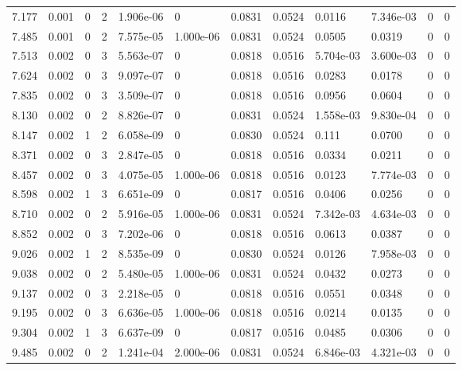 \documentclass[preview]{standalone}
\begin{document}
{{{\begin{tabular}{L{1.2cm}C{1.2cm} C{0.3cm}C{0.5cm} C{1.4cm}C{1.4cm} C{1.4cm}C{1.4cm} C{1.6cm}C{1.6cm} C{1.6cm}C{1.6cm}}
  7.177  &  0.001  & 0     &  2 &  1.906e-06  & 0  &  0.0831&   0.0524& 0.0116 & 7.346e-03   &  0 & 0  \\ 
  7.485  &  0.001  & 0     &  2 &  7.575e-05  & 1.000e-06  &  0.0831&   0.0524& 0.0505 & 0.0319   &  0 & 0  \\ 
  7.513  &  0.002  & 0     &  3 &  5.563e-07  & 0  &  0.0818&   0.0516& 5.704e-03 & 3.600e-03   &  0 & 0  \\ 
  7.624  &  0.002  & 0     &  3 &  9.097e-07  & 0  &  0.0818&   0.0516& 0.0283 & 0.0178   &  0 & 0  \\ 
  7.835  &  0.002  & 0     &  3 &  3.509e-07  & 0  &  0.0818&   0.0516& 0.0956 & 0.0604   &  0 & 0  \\ 
  8.130  &  0.002  & 0     &  2 &  8.826e-07  & 0  &  0.0831&   0.0524& 1.558e-03 & 9.830e-04   &  0 & 0  \\ 
  8.147  &  0.002  & 1     &  2 &  6.058e-09  & 0  &  0.0830&   0.0524& 0.111 & 0.0700   &  0 & 0  \\ 
  8.371  &  0.002  & 0     &  3 &  2.847e-05  & 0  &  0.0818&   0.0516& 0.0334 & 0.0211   &  0 & 0  \\ 
  8.457  &  0.002  & 0     &  3 &  4.075e-05  & 1.000e-06  &  0.0818&   0.0516& 0.0123 & 7.774e-03   &  0 & 0  \\ 
  8.598  &  0.002  & 1     &  3 &  6.651e-09  & 0  &  0.0817&   0.0516& 0.0406 & 0.0256   &  0 & 0  \\ 
  8.710  &  0.002  & 0     &  2 &  5.916e-05  & 1.000e-06  &  0.0831&   0.0524& 7.342e-03 & 4.634e-03   &  0 & 0  \\ 
  8.852  &  0.002  & 0     &  3 &  7.202e-06  & 0  &  0.0818&   0.0516& 0.0613 & 0.0387   &  0 & 0  \\ 
  9.026  &  0.002  & 1     &  2 &  8.535e-09  & 0  &  0.0830&   0.0524& 0.0126 & 7.958e-03   &  0 & 0  \\ 
  9.038  &  0.002  & 0     &  2 &  5.480e-05  & 1.000e-06  &  0.0831&   0.0524& 0.0432 & 0.0273   &  0 & 0  \\ 
  9.137  &  0.002  & 0     &  3 &  2.218e-05  & 0  &  0.0818&   0.0516& 0.0551 & 0.0348   &  0 & 0  \\ 
  9.195  &  0.002  & 0     &  3 &  6.636e-05  & 1.000e-06  &  0.0818&   0.0516& 0.0214 & 0.0135   &  0 & 0  \\ 
  9.304  &  0.002  & 1     &  3 &  6.637e-09  & 0  &  0.0817&   0.0516& 0.0485 & 0.0306   &  0 & 0  \\ 
  9.485  &  0.002  & 0     &  2 &  1.241e-04  & 2.000e-06  &  0.0831&   0.0524& 6.846e-03 & 4.321e-03   &  0 & 0  \\ 

\end{tabular}}}}
\end{document}
